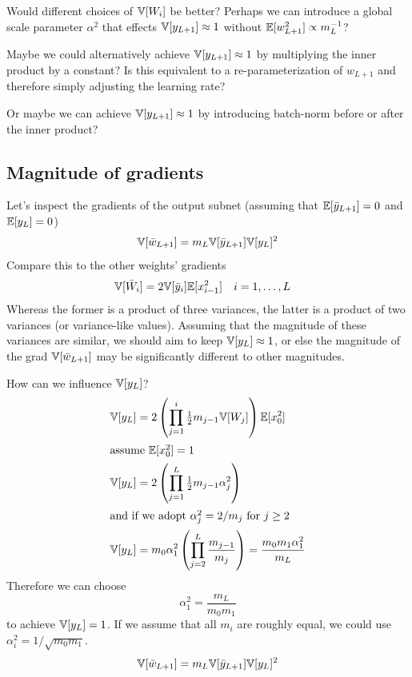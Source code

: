 Would different choices of $\mathbb{V}[W_{i}]$ be better?
Perhaps we can introduce a global scale parameter $\alpha^2$ that effects $\mathbb{V}[y_{L+1}] \approx 1$ without $\mathbb{E}[w_{L+1}^2] \propto m_{L}^{-1}$?

Maybe we could alternatively achieve $\mathbb{V}[y_{L+1}] \approx 1$ by multiplying the inner product by a constant?
Is this equivalent to a re-parameterization of $w_{L+1}$ and therefore simply adjusting the learning rate?

Or maybe we can achieve $\mathbb{V}[y_{L+1}] \approx 1$ by introducing batch-norm before or after the inner product?


\clearpage

\subsection{Magnitude of gradients}

Let's inspect the gradients of the output subnet (assuming that $\mathbb{E}[\bar{y}_{L+1}] = 0$ and $\mathbb{E}[y_{L}] = 0$)
\begin{align}
\mathbb{V}[\bar{w}_{L+1}] = m_{L} \mathbb{V}[\bar{y}_{L+1}] \mathbb{V}[y_{L}]^{2}
\end{align}
Compare this to the other weights' gradients
\begin{align}
\mathbb{V}[\bar{W}_{i}] & = 2 \mathbb{V}[\bar{y}_{i}] \mathbb{E}[x_{i - 1}^2] && i = 1, \dots, L
\end{align}
Whereas the former is a product of three variances, the latter is a product of two variances (or variance-like values).
Assuming that the magnitude of these variances are similar, we should aim to keep $\mathbb{V}[y_{L}] \approx 1$, or else the magnitude of the grad $\mathbb{V}[\bar{w}_{L+1}]$ may be significantly different to other magnitudes.

How can we influence $\mathbb{V}[y_{L}]$?
\begin{align}
\mathbb{V}[y_{L}] & = 2 \left(\prod_{j = 1}^{i} \tfrac{1}{2} m_{j - 1} \mathbb{V}[W_{j}]\right) \mathbb{E}[x_{0}^2] \\
\intertext{assume $\mathbb{E}[x_{0}^2] = 1$}
\mathbb{V}[y_{L}] & = 2 \left(\prod_{j = 1}^{L} \tfrac{1}{2} m_{j - 1} \alpha_{j}^2\right) \\
\intertext{and if we adopt $\alpha_{j}^2 = 2/m_{j}$ for $j \ge 2$}
\mathbb{V}[y_{L}] & = m_{0} \alpha_{1}^2 \left(\prod_{j = 2}^{L} \frac{m_{j-1}}{m_{j}} \right)
  = \frac{m_{0} m_{1} \alpha_{1}^2}{m_{L}}
\end{align}
Therefore we can choose
\begin{equation}
\alpha_{1}^2 = \frac{m_{L}}{m_{0} m_{1}}
\end{equation}
to achieve $\mathbb{V}[y_{L}] = 1$.
If we assume that all $m_{i}$ are roughly equal, we could use $\alpha_{i}^2 = 1 / \sqrt{m_{0} m_{1}}$.
\begin{align}
\mathbb{V}[\bar{w}_{L+1}] = m_{L} \mathbb{V}[\bar{y}_{L+1}] \mathbb{V}[y_{L}]^{2}
\end{align}


